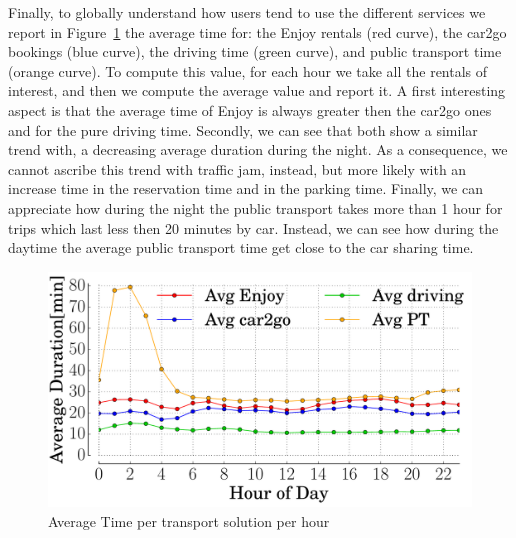 Finally, to globally understand how users tend to use the different services we report in Figure~\ref{fig:avg_comparison} the average time for: the Enjoy rentals (red curve), the car2go bookings (blue curve), the driving time (green curve), and public transport time (orange curve). To compute this value, for each hour we take all the rentals of interest, and then we compute the average value and report it. A first interesting aspect is that the average time of Enjoy is always greater then the car2go ones and for the pure driving time. Secondly, we can see that both show a similar trend with, a decreasing average duration during the night. As a consequence, we cannot ascribe this trend with traffic jam, instead, but more likely with an increase time in the reservation time and in the parking time. Finally, we can appreciate how during the night the public transport takes more than 1 hour for trips which last less then 20 minutes by car. Instead, we can see how during the daytime the average public transport time get close to the car sharing time. 



\begin{figure}[h!]
\centering
 \includegraphics[width=0.85\columnwidth]{figures/average_duration.pdf}
 \caption{Average Time per transport solution per hour \label{fig:avg_comparison}}
\end{figure}

